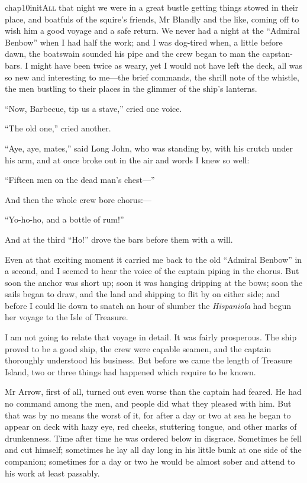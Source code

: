  
   \lettrine[lines=4,image=true]{chap10initA}{ll} that night we were in a great bustle getting things stowed in their place, and boatfuls of the squire’s friends, Mr Blandly and the like, coming off to wish him a good voyage and a safe return. We never had a night at the \enquote{Admiral Benbow} when I had half the work; and I was dog-tired when, a little before dawn, the boatswain sounded his pipe and the crew began to man the capstan-bars. I might have been twice as weary, yet I would not have left the deck, all was so new and interesting to me---the brief commands, the shrill note of the whistle, the men bustling to their places in the glimmer of the ship’s lanterns.

\enquote{Now, Barbecue, tip us a stave,} cried one voice.

\enquote{The old one,} cried another.

\enquote{Aye, aye, mates,} said Long John, who was standing by, with his crutch under his arm, and at once broke out in the air and words I knew so well:

\enquote{Fifteen men on the dead man’s chest---}

And then the whole crew bore chorus:---

\enquote{Yo-ho-ho, and a bottle of rum!}

And at the third \enquote{Ho!} drove the bars before them with a will.

Even at that exciting moment it carried me back to the old \enquote{Admiral Benbow} in a second, and I seemed to hear the voice of the captain piping in the chorus. But soon the anchor was short up; soon it was hanging dripping at the bows; soon the sails began to draw, and the land and shipping to flit by on either side; and before I could lie down to snatch an hour of slumber the \textit{Hispaniola} had begun her voyage to the Isle of Treasure.

I am not going to relate that voyage in detail. It was fairly prosperous. The ship proved to be a good ship, the crew were capable seamen, and the captain thoroughly understood his business. But before we came the length of Treasure Island, two or three things had happened which require to be known.

Mr Arrow, first of all, turned out even worse than the captain had feared. He had no command among the men, and people did what they pleased with him. But that was by no means the worst of it, for after a day or two at sea he began to appear on deck with hazy eye, red cheeks, stuttering tongue, and other marks of drunkenness. Time after time he was ordered below in disgrace. Sometimes he fell and cut himself; sometimes he lay all day long in his little bunk at one side of the companion; sometimes for a day or two he would be almost sober and attend to his work at least passably.

